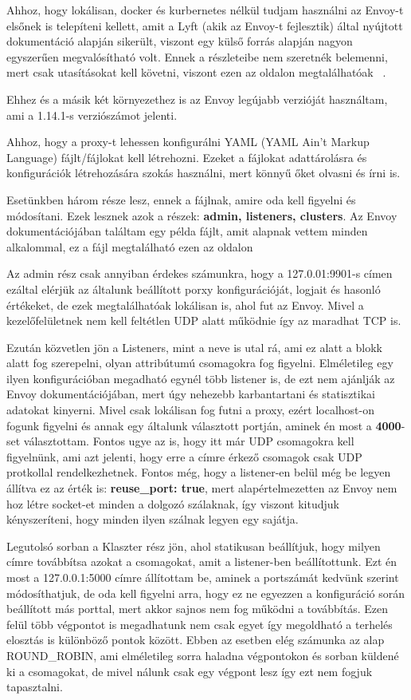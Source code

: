 \documentclass[a4paper,oneside]{article}
\begin{document}
Ahhoz, hogy lokálisan, docker és kurbernetes nélkül tudjam használni az Envoy-t
elsőnek is telepíteni kellett, amit a Lyft (akik az Envoy-t fejlesztik) által
nyújtott dokumentáció alapján sikerült, viszont egy külső forrás alapján nagyon
egyszerűen megvalósítható volt. Ennek a részleteibe nem szeretnék belemenni, mert
csak utasításokat kell követni, viszont ezen az oldalon megtalálhatóak ~\cite{envoylocal}.

Ehhez és a másik két környezethez is az Envoy legújabb verzióját használtam, ami a
1.14.1-s verziószámot jelenti.

Ahhoz, hogy a proxy-t lehessen konfigurálni YAML (YAML Ain't Markup Language)
fájlt/fájlokat kell létrehozni. Ezeket a fájlokat adattárolásra és konfigurációk
létrehozására szokás használni, mert könnyű őket olvasni és írni is.

Esetünkben három része lesz, ennek a fájlnak, amire oda kell figyelni és módosítani.
Ezek lesznek azok a részek: \textbf{admin, listeners, clusters}. Az Envoy
dokumentációjában találtam egy példa fájlt, amit alapnak vettem minden alkalommal,
ez a fájl megtalálható ezen az oldalon ~\cite{envoyudpconf}

Az admin rész csak annyiban érdekes számunkra, hogy a 127.0.01:9901-s címen
ezáltal elérjük az általunk beállított porxy konfigurációját, logjait és hasonló
értékeket, de ezek megtalálhatóak lokálisan is, ahol fut az Envoy. Mivel a
kezelőfelületnek nem kell feltétlen UDP alatt működnie így az maradhat TCP is.

Ezután közvetlen jön a Listeners, mint a neve is utal rá, ami ez alatt a blokk
alatt fog szerepelni, olyan attribútumú csomagokra fog figyelni. Elméletileg
egy ilyen konfigurációban megadható egynél több listener is, de ezt nem ajánlják
az Envoy dokumentációjában, mert úgy nehezebb karbantartani és statisztikai adatokat
kinyerni. Mivel csak lokálisan fog futni a proxy, ezért localhost-on fogunk figyelni
és annak egy általunk választott portján, aminek én most a \textbf{4000}-set választottam.
Fontos ugye az is, hogy itt már UDP csomagokra kell figyelnünk, ami azt jelenti,
hogy erre a címre érkező csomagok csak UDP protkollal rendelkezhetnek. Fontos
még, hogy a listener-en belül még be legyen állítva ez az érték is:
\textbf{reuse\_port: true}, mert alapértelmezetten az Envoy nem hoz létre socket-et
minden a dolgozó szálaknak, így viszont kitudjuk kényszeríteni, hogy minden
ilyen szálnak legyen egy sajátja.

Legutolsó sorban a Klaszter rész jön, ahol statikusan beállítjuk, hogy milyen címre
továbbítsa azokat a csomagokat, amit a listener-ben beállítottunk. Ezt én most
a 127.0.0.1:5000 címre állítottam be, aminek a portszámát kedvünk szerint módosíthatjuk,
de oda kell figyelni arra, hogy ez ne egyezzen a konfiguráció során beállított más
porttal, mert akkor sajnos nem fog működni a továbbítás. Ezen felül több
végpontot is megadhatunk nem csak egyet így megoldható a terhelés elosztás is
különböző pontok között. Ebben az esetben elég számunka az alap ROUND\_ROBIN,
ami elméletileg sorra haladna végpontokon és sorban küldené ki a csomagokat, de
mivel nálunk csak egy végpont lesz így ezt nem fogjuk tapasztalni.
\end{document}
